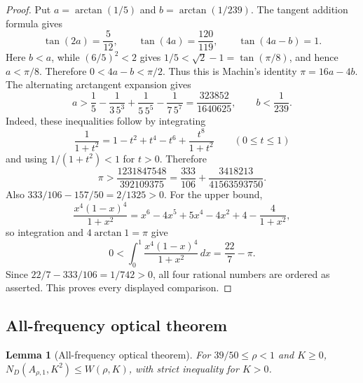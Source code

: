 \documentclass[11pt]{article}
\numberwithin{equation}{section}
\newtheorem{lemma}[theorem]{Lemma}
\theoremstyle{definition}
\theoremstyle{remark}
\begin{document}
\begin{proof}
Put \(a=\arctan(1/5)\) and \(b=\arctan(1/239)\).  The tangent addition
formula gives
\[
 \tan(2a)=\frac5{12},\qquad
 \tan(4a)=\frac{120}{119},\qquad
 \tan(4a-b)=1.
\]
Here \(b<a\), while \((6/5)^2<2\) gives
\(1/5<\sqrt2-1=\tan(\pi/8)\), and hence \(a<\pi/8\).  Therefore
\(0<4a-b<\pi/2\).  Thus this is Machin's identity
\(\pi=16a-4b\).  The alternating arctangent expansion gives
\[
 a>\frac15-\frac1{3\,5^3}+\frac1{5\,5^5}-\frac1{7\,5^7}
  =\frac{323852}{1640625},
 \qquad b<\frac1{239}.
\]
Indeed, these inequalities follow by integrating
\[
 \frac1{1+t^2}=1-t^2+t^4-t^6+\frac{t^8}{1+t^2}
 \qquad(0\leq t\leq1)
\]
and using \(1/(1+t^2)<1\) for \(t>0\).
Therefore
\[
 \pi>
 \frac{1231847548}{392109375}
 =\frac{333}{106}+\frac{3418213}{41563593750}.
\]
Also \(333/106-157/50=2/1325>0\).  For the upper bound,
\[
 \frac{x^4(1-x)^4}{1+x^2}
 =x^6-4x^5+5x^4-4x^2+4-\frac4{1+x^2},
\]
so integration and \(4\arctan1=\pi\) give
\[
 0<\int_0^1\frac{x^4(1-x)^4}{1+x^2}\,dx
 =\frac{22}{7}-\pi.
\]
Since \(22/7-333/106=1/742>0\), all four rational numbers are ordered
as asserted.
This proves every displayed comparison.
\end{proof}

\subsection{All-frequency optical theorem}

\begin{lemma}[All-frequency optical theorem]
\label{cm:lem-optical}
For \(39/50\leq\rho<1\) and \(K\geq0\),
\(N_D(A_{\rho,1},K^2)\leq W(\rho,K)\), with strict inequality for
\(K>0\).
\end{lemma}
\end{document}
